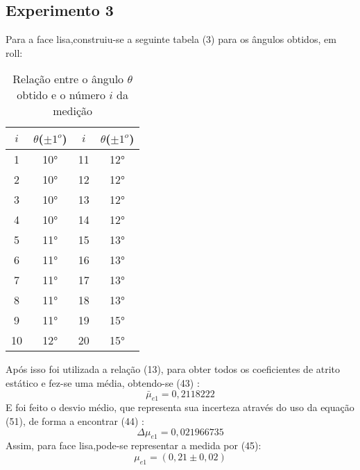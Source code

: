 \documentclass[12pt, letterpaper]{article}
\begin{document}
\subsection{Experimento 3}
Para a face lisa,construiu-se a seguinte tabela (3) para os ângulos obtidos, em roll: 


\begin{table}[!h]
 \centering
        \caption{Relação entre o ângulo $\theta$ obtido e o número $i$ da medição}
         \begin{tabular}{| c | c | c | c |}
           \hline
             $i$  & $\theta$($\pm 1^{o}$) & $i$  & $\theta$($\pm 1^{o}$)\\
            \hline
               1   &   10° &  11 & 12°   \\
           \hline    
            2   &   10°     & 12 &  12° \\
           \hline    
            3   &   10°  &   13 & 12°\\
           \hline    
               4   &  10° &   14 & 12° \\
           \hline    
               5  &   11°  &  15 & 13°\\
           \hline    
               6   &   11°  & 16 & 13°\\
           \hline    
               7    &  11°   &17 & 13°\\
           \hline
               8    &  11° & 18 & 13°\\
           \hline
               9  & 11° & 19 & 15° \\
            \hline 
             10 & 12°  &  20 & 15°\\
             
             \hline 
        \end{tabular} 
        \label{tab:2}

\end{table}
Após isso foi utilizada a relação (13), para obter todos os coeficientes de atrito estático e fez-se uma média, obtendo-se (43) :
\begin{equation}
\bar\mu_{e1} = 0,2118222
\end{equation}
E foi feito o desvio médio, que representa sua incerteza através do uso da equação (51), de forma a encontrar (44) :
\begin{equation}
\Delta\mu_{e1} = 0,021966735
\end{equation}
Assim, para face lisa,pode-se representar a medida por (45):
\begin{equation}
    \mu_{e1} = (0,21 \pm 0,02) 
\end{equation}
\end{document}
